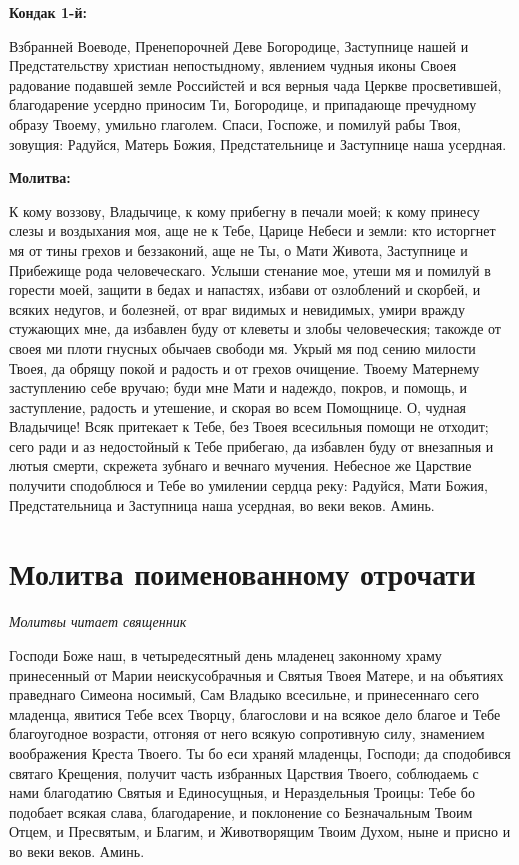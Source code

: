\medskip
\bfseries Кондак 1-й:\normalfont{}\nopagebreak


Взбранней Воеводе, Пренепорочней Деве Богородице, Заступнице нашей и Предстательству христиан непостыдному, явлением чудныя иконы Своея радование подавшей земле Российстей и вся верныя чада Церкве просветившей, благодарение усердно приносим Ти, Богородице, и припадающе пречудному образу Твоему, умильно глаголем. Спаси, Госпоже, и помилуй рабы Твоя, зовущия: Радуйся, Матерь Божия, Предстательнице и Заступнице наша усердная.


\medskip
\bfseries Молитва:\normalfont{}\nopagebreak


К кому воззову, Владычице, к кому прибегну в печали моей; к кому принесу слезы и воздыхания моя, аще не к Тебе, Царице Небеси и земли: кто исторгнет мя от тины грехов и беззаконий, аще не Ты, о Мати Живота, Заступнице и Прибежище рода человеческаго. Услыши стенание мое, утеши мя и помилуй в горести моей, защити в бедах и напастях, избави от озлоблений и скорбей, и всяких недугов, и болезней, от враг видимых и невидимых, умири вражду стужающих мне, да избавлен буду от клеветы и злобы человеческия; такожде от своея ми плоти гнусных обычаев свободи мя. Укрый мя под сению милости Твоея, да обрящу покой и радость и от грехов очищение. Твоему Матернему заступлению себе вручаю; буди мне Мати и надеждо, покров, и помощь, и заступление, радость и утешение, и скорая во всем Помощнице. О, чудная Владычице! Всяк притекает к Тебе, без Твоея всесильныя помощи не отходит; сего ради и аз недостойный к Тебе прибегаю, да избавлен буду от внезапныя и лютыя смерти, скрежета зубнаго и вечнаго мучения. Небесное же Царствие получити сподоблюся и Тебе во умилении сердца реку: Радуйся, Мати Божия, Предстательница и Заступница наша усердная, во веки веков. Аминь.\mychapterending


 

\section{Молитва поименованному отрочати}
 


\itshape Молитвы читает священник\normalfont{}

Господи Боже наш, в четыредесятный день младенец законному храму принесенный от Марии неискусобрачныя и Святыя Твоея Матере, и на объятиях праведнаго Симеона носимый, Сам Владыко всесильне, и принесеннаго сего младенца, явитися Тебе всех Творцу, благослови и на всякое дело благое и Тебе благоугодное возрасти, отгоняя от него всякую сопротивную силу, знамением воображения Креста Твоего. Ты бо еси храняй младенцы, Господи; да сподобився святаго Крещения, получит часть избранных Царствия Твоего, соблюдаемь с нами благодатию Святыя и Единосущныя, и Нераздельныя Троицы: Тебе бо подобает всякая слава, благодарение, и поклонение со Безначальным Твоим Отцем, и Пресвятым, и Благим, и Животворящим Твоим Духом, ныне и присно и во веки веков. Аминь. 


